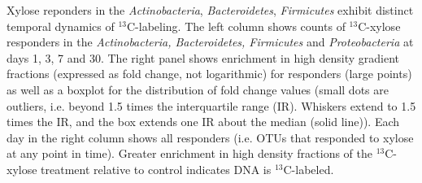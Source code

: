 Xylose reponders in the \textit{Actinobacteria}, \textit{Bacteroidetes},
\textit{Firmicutes} exhibit distinct temporal dynamics of $^{13}$C-labeling.
The left column shows counts of $^{13}$C-xylose responders in the
\textit{Actinobacteria, Bacteroidetes, Firmicutes} and \textit{Proteobacteria}
at days 1, 3, 7 and 30. The right panel shows enrichment in high density
gradient fractions (expressed as fold change, not logarithmic) for responders
(large points) as well as a boxplot for the distribution of fold change values
(small dots are outliers, i.e. beyond 1.5 times the interquartile range (IR).
Whiskers extend to 1.5 times the IR, and the box extends one IR about the
median (solid line)). Each day in the right column shows all responders (i.e.
OTUs that responded to xylose at any point in time). Greater enrichment in high
density fractions of the $^{13}$C-xylose treatment relative to control indicates
DNA is $^{13}$C-labeled.
    
